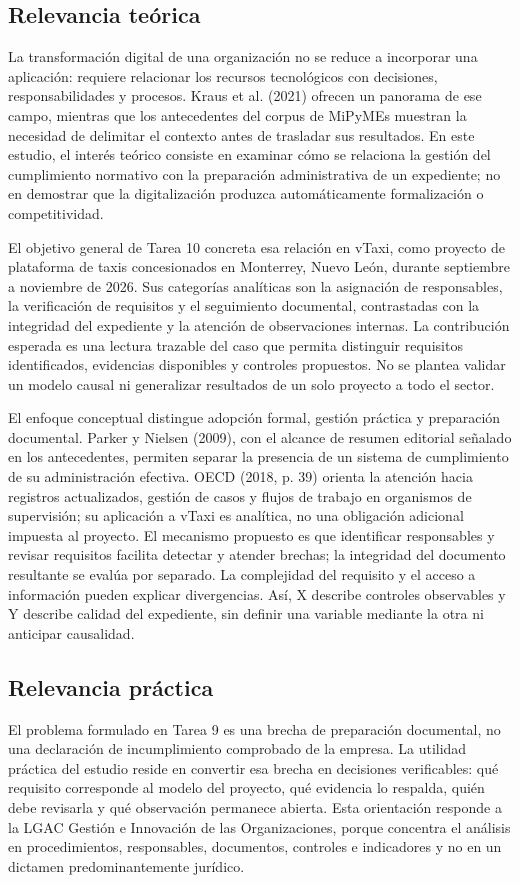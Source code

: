 {\subsection{Relevancia teórica}
La transformación digital de una organización no se reduce a incorporar una aplicación: requiere relacionar los recursos tecnológicos con decisiones, responsabilidades y procesos. Kraus et al. (2021) ofrecen un panorama de ese campo, mientras que los antecedentes del corpus de MiPyMEs muestran la necesidad de delimitar el contexto antes de trasladar sus resultados. En este estudio, el interés teórico consiste en examinar cómo se relaciona la gestión del cumplimiento normativo con la preparación administrativa de un expediente; no en demostrar que la digitalización produzca automáticamente formalización o competitividad.


El objetivo general de Tarea 10 concreta esa relación en vTaxi, como proyecto de plataforma de taxis concesionados en Monterrey, Nuevo León, durante septiembre a noviembre de 2026. Sus categorías analíticas son la asignación de responsables, la verificación de requisitos y el seguimiento documental, contrastadas con la integridad del expediente y la atención de observaciones internas. La contribución esperada es una lectura trazable del caso que permita distinguir requisitos identificados, evidencias disponibles y controles propuestos. No se plantea validar un modelo causal ni generalizar resultados de un solo proyecto a todo el sector.


El enfoque conceptual distingue adopción formal, gestión práctica y preparación documental. Parker y Nielsen (2009), con el alcance de resumen editorial señalado en los antecedentes, permiten separar la presencia de un sistema de cumplimiento de su administración efectiva. OECD (2018, p. 39) orienta la atención hacia registros actualizados, gestión de casos y flujos de trabajo en organismos de supervisión; su aplicación a vTaxi es analítica, no una obligación adicional impuesta al proyecto. El mecanismo propuesto es que identificar responsables y revisar requisitos facilita detectar y atender brechas; la integridad del documento resultante se evalúa por separado. La complejidad del requisito y el acceso a información pueden explicar divergencias. Así, X describe controles observables y Y describe calidad del expediente, sin definir una variable mediante la otra ni anticipar causalidad.


\subsection{Relevancia práctica}
El problema formulado en Tarea 9 es una brecha de preparación documental, no una declaración de incumplimiento comprobado de la empresa. La utilidad práctica del estudio reside en convertir esa brecha en decisiones verificables: qué requisito corresponde al modelo del proyecto, qué evidencia lo respalda, quién debe revisarla y qué observación permanece abierta. Esta orientación responde a la LGAC Gestión e Innovación de las Organizaciones, porque concentra el análisis en procedimientos, responsables, documentos, controles e indicadores y no en un dictamen predominantemente jurídico.


}
